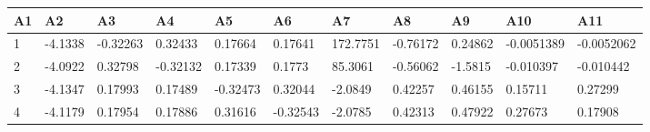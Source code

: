 \begin{tabular}{lllllllllll}
A1 & A2 & A3 & A4 & A5 & A6 & A7 & A8 & A9 & A10 & A11 \\ 
\hline 
1 & -4.1338 & -0.32263 & 0.32433 & 0.17664 & 0.17641 & 172.7751 & -0.76172 & 0.24862 & -0.0051389 & -0.0052062 \\ 
2 & -4.0922 & 0.32798 & -0.32132 & 0.17339 & 0.1773 & 85.3061 & -0.56062 & -1.5815 & -0.010397 & -0.010442 \\ 
3 & -4.1347 & 0.17993 & 0.17489 & -0.32473 & 0.32044 & -2.0849 & 0.42257 & 0.46155 & 0.15711 & 0.27299 \\ 
4 & -4.1179 & 0.17954 & 0.17886 & 0.31616 & -0.32543 & -2.0785 & 0.42313 & 0.47922 & 0.27673 & 0.17908 \\ 
\hline 
\end{tabular}